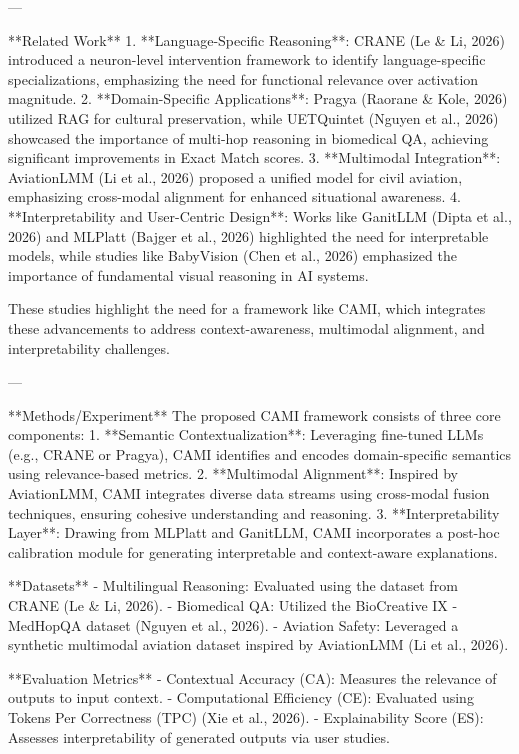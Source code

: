 ---

**Related Work**  
1. **Language-Specific Reasoning**: CRANE (Le & Li, 2026) introduced a neuron-level intervention framework to identify language-specific specializations, emphasizing the need for functional relevance over activation magnitude.  
2. **Domain-Specific Applications**: Pragya (Raorane & Kole, 2026) utilized RAG for cultural preservation, while UETQuintet (Nguyen et al., 2026) showcased the importance of multi-hop reasoning in biomedical QA, achieving significant improvements in Exact Match scores.  
3. **Multimodal Integration**: AviationLMM (Li et al., 2026) proposed a unified model for civil aviation, emphasizing cross-modal alignment for enhanced situational awareness.  
4. **Interpretability and User-Centric Design**: Works like GanitLLM (Dipta et al., 2026) and MLPlatt (Bajger et al., 2026) highlighted the need for interpretable models, while studies like BabyVision (Chen et al., 2026) emphasized the importance of fundamental visual reasoning in AI systems.  

These studies highlight the need for a framework like CAMI, which integrates these advancements to address context-awareness, multimodal alignment, and interpretability challenges.

---

**Methods/Experiment**  
The proposed CAMI framework consists of three core components:  
1. **Semantic Contextualization**: Leveraging fine-tuned LLMs (e.g., CRANE or Pragya), CAMI identifies and encodes domain-specific semantics using relevance-based metrics.  
2. **Multimodal Alignment**: Inspired by AviationLMM, CAMI integrates diverse data streams using cross-modal fusion techniques, ensuring cohesive understanding and reasoning.  
3. **Interpretability Layer**: Drawing from MLPlatt and GanitLLM, CAMI incorporates a post-hoc calibration module for generating interpretable and context-aware explanations.

**Datasets**  
- Multilingual Reasoning: Evaluated using the dataset from CRANE (Le & Li, 2026).  
- Biomedical QA: Utilized the BioCreative IX - MedHopQA dataset (Nguyen et al., 2026).  
- Aviation Safety: Leveraged a synthetic multimodal aviation dataset inspired by AviationLMM (Li et al., 2026).  

**Evaluation Metrics**  
- Contextual Accuracy (CA): Measures the relevance of outputs to input context.  
- Computational Efficiency (CE): Evaluated using Tokens Per Correctness (TPC) (Xie et al., 2026).  
- Explainability Score (ES): Assesses interpretability of generated outputs via user studies.

